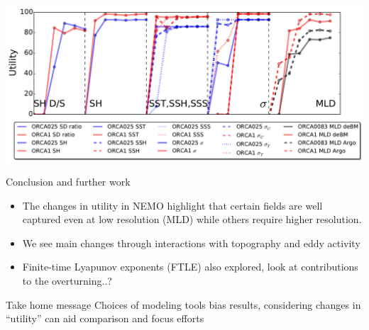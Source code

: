 \documentclass{beamer}
\begin{document}
\begin{frame}
 \includegraphics[width=1\textwidth]{UtilityCut.pdf}
\end{frame}




\begin{frame}{Conclusion and further work}

\begin{itemize}
  \item The changes in utility in NEMO highlight that certain fields are well captured even at low resolution (MLD) while others require higher resolution. 
  \item We see main changes through interactions with topography and eddy activity
  \item Finite-time Lyapunov exponents (FTLE) also explored, look at contributions to the overturning..?
\end{itemize}

 \pause
\begin{alertblock}{Take home message}
\centering Choices of modeling tools bias results, considering changes in ``utility'' can aid comparison and focus efforts
\end{alertblock}
\end{frame}
\end{document}
